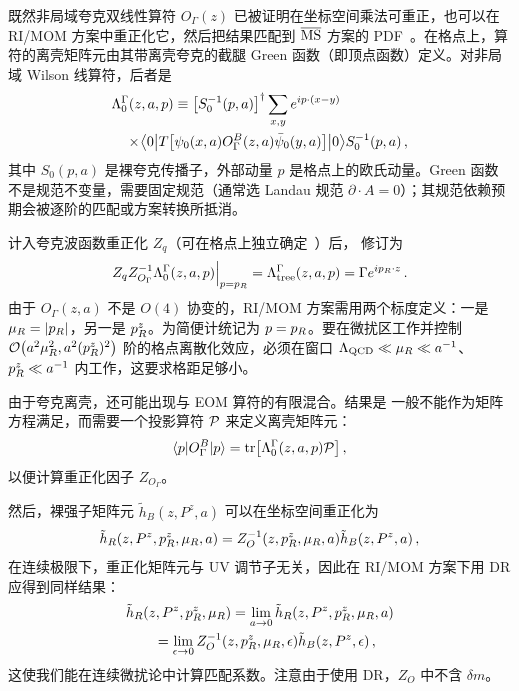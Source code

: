 既然非局域夸克双线性算符 $O_\Gamma(z)$ 已被证明在坐标空间乘法可重正，也可以在 RI/MOM 方案中重正化它，然后把结果匹配到 ${\overline{\rm MS}}$ 方案的 PDF~\cite{Constantinou:2017sej,Stewart:2017tvs}。在格点上，算符的离壳矩阵元由其带离壳夸克的截腿 Green 函数（即顶点函数）定义。对非局域 Wilson 线算符，后者是
\begin{align} \label{eq:Lambda}
	&\Lambda^{\Gamma}_0(z, a, p) \equiv
	\left[S^{-1}_0(p,a)\right]^\dagger \sum_{x,y}e^{ip\cdot (x-y)}
	\nonumber\\
	&\ \ \  \times\! \big\langle 0 \big|T\bigl[\psi_0(x,a) O^B_\Gamma(z,a) \bar{\psi}_0(y,a)\bigr]\big|0\big\rangle S^{-1}_0(p,a)\,,
\end{align}
其中 $S_0(p,a)$ 是裸夸克传播子，外部动量 $p$ 是格点上的欧氏动量。Green 函数不是规范不变量，需要固定规范（通常选 Landau 规范 $\partial\cdot  A=0$）；其规范依赖预期会被逐阶的匹配或方案转换所抵消。

计入夸克波函数重正化 $Z_q$（可在格点上独立确定~\cite{Martinelli:1994ty}）后， 修订为
\begin{align} \label{eq:rimomvertex}
	Z_q Z^{-1}_{O_\Gamma} \Lambda^{\Gamma}_0(z,a,p)\Big|_{p=p_{\tiny R}}= \Lambda^{\Gamma}_{\rm tree}(z,a,p) = \Gamma e^{ip_{\tiny R}\cdot z}\,.
\end{align}
由于 $O_\Gamma(z,a)$ 不是 $O(4)$ 协变的，RI/MOM 方案需用两个标度定义：一是 $\mu_{\tiny R}=|p_R|$，另一是 $p_{\tiny R}^z$。为简便计统记为 $p=p_{\tiny R}$。要在微扰区工作并控制 ${\cal O}\big(a^2\mu_{\tiny R}^2, a^2(p_{\tiny R}^z)^2\big)$ 阶的格点离散化效应，必须在窗口 $\Lambda_{\rm QCD}\ll \mu_{\tiny R}\ll a^{-1}$、$p_{\tiny R}^z \ll a^{-1}$ 内工作，这要求格距足够小。

由于夸克离壳，还可能出现与 EOM 算符的有限混合。结果是  一般不能作为矩阵方程满足，而需要一个投影算符 ${\cal P}$ 来定义离壳矩阵元：
\begin{align}
	\langle p| O^B_\Gamma |p\rangle = {\rm tr}\big[\Lambda^{\Gamma}_0(z,a,p) {\cal P}\big]\,,
\end{align}
以便计算重正化因子 $Z_{O_\Gamma}$。

然后，裸强子矩阵元 $\tilde{h}_B(z,P^z,a)$ 可以在坐标空间重正化为
\begin{align} \label{eq:rimomh}
	\tilde{h}_R(z,P^z, p_{\tiny R}^z,\mu_{\tiny R},a)=Z^{-1}_{O}(z,p_{\tiny R}^z,\mu_{\tiny R},a)\tilde{h}_B(z,P^z,a) \,,
\end{align}
在连续极限下，重正化矩阵元与 UV 调节子无关，因此在 RI/MOM 方案下用 DR 应得到同样结果：
\begin{align}\label{eq:continuum}
	&\tilde{h}_R(z,P^z, p_{\tiny R}^z,\mu_{\tiny R})=\lim_{a\to0}\tilde{h}_R(z,P^z, p_{\tiny R}^z,\mu_{\tiny R},a) \nonumber\\
	&\qquad = \lim_{\epsilon\to0}Z^{-1}_{O}(z,p_{\tiny R}^z,\mu_{\tiny R},\epsilon)\tilde{h}_B(z,P^z,\epsilon)\,,
\end{align}
这使我们能在连续微扰论中计算匹配系数。注意由于使用 DR，$Z_{O}$ 中不含 $\delta m$。

